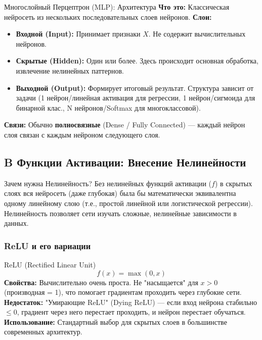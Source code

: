 \begin{myblock}{Многослойный Перцептрон (MLP): Архитектура}
    \textbf{Что это:} Классическая нейросеть из нескольких последовательных слоев нейронов.
    \textbf{Слои:}
    \begin{itemize}[nosep, leftmargin=*]
        \item \textbf{Входной (Input):} Принимает признаки $X$. Не содержит вычислительных нейронов.
        \item \textbf{Скрытые (Hidden):} Один или более. Здесь происходит основная обработка, извлечение нелинейных паттернов.
        \item \textbf{Выходной (Output):} Формирует итоговый результат. Структура зависит от задачи (1 нейрон/линейная активация для регрессии, 1 нейрон/сигмоида для бинарной клас., N нейронов/Softmax для многоклассовой).
    \end{itemize}
    \textbf{Связи:} Обычно \textbf{полносвязные} (Dense / Fully Connected) — каждый нейрон слоя связан с каждым нейроном следующего слоя.
\end{myblock}

\subsection{B Функции Активации: Внесение Нелинейности}

\begin{alerttextbox}{Зачем нужна Нелинейность?}
    Без нелинейных функций активации ($f$) в скрытых слоях вся нейросеть (даже глубокая) была бы математически эквивалентна одному линейному слою (т.е., простой линейной или логистической регрессии). Нелинейность позволяет сети изучать сложные, нелинейные зависимости в данных.
\end{alerttextbox}

\subsubsection{ReLU и его вариации}
\begin{myexampleblock}{ReLU (Rectified Linear Unit)}
    \[ f(x) = \max(0, x) \]
    \textbf{Свойства:} Вычислительно очень проста. Не "насыщается" для $x>0$ (производная = 1), что помогает градиентам проходить через глубокие сети.
    \textbf{Недостаток:} "Умирающие ReLU" (Dying ReLU) — если вход нейрона стабильно $ \le 0$, градиент через него перестает проходить, и нейрон перестает обучаться.
    \textbf{Использование:} Стандартный выбор для скрытых слоев в большинстве современных архитектур.
\end{myexampleblock}

